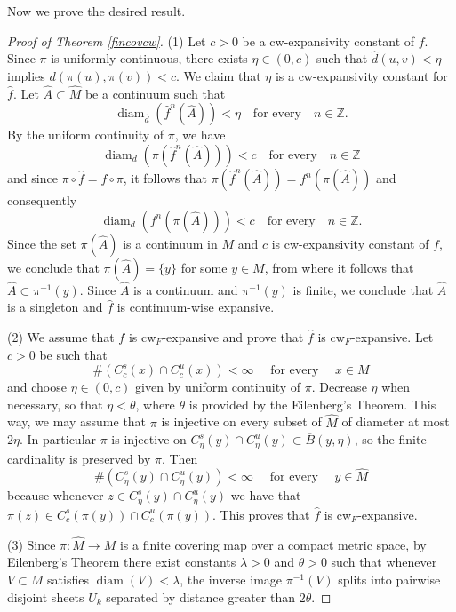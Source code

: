 \documentclass{amsart}
\theoremstyle{plain}
\theoremstyle{definition}
\begin{document}
Now we prove the desired result.

\begin{proof}[Proof of Theorem \ref{fincovcw}]

(1) Let $c>0$ be a cw-expansivity constant of $f$. Since $\pi$ is uniformly continuous, there exists $\eta\in(0,c)$ such that $\widehat d(u,v)<\eta$ implies $d(\pi(u),\pi(v))<c$. We claim that $\eta$ is a cw-expansivity constant for $\widehat f$. Let $\widehat A\subset\widehat M$ be a continuum such that 
$$\operatorname{diam}_{\widehat d}(\widehat f^n(\widehat A))<\eta \,\,\,\,\,\, \text{for every} \,\,\,\,\,\, n\in\mathbb Z.$$
By the uniform continuity of $\pi$, we have
$$\operatorname{diam}_d(\pi(\widehat f^n(\widehat A)))<c\,\,\,\,\,\, \text{for every} \,\,\,\,\,\, n\in\mathbb Z$$
and since $\pi\circ\widehat f=f\circ\pi$, it follows that
$\pi(\widehat f^n(\widehat A))=f^n(\pi(\widehat A))$ and consequently
$$\operatorname{diam}_d(f^n(\pi(\widehat A)))<c\,\,\,\,\,\, \text{for every} \,\,\,\,\,\, n\in\mathbb Z.$$
Since the set $\pi(\widehat A)$ is a continuum in $M$ and $c$ is cw-expansivity constant of $f$, we conclude that $\pi(\widehat A)=\{y\}$ for some $y\in M$, from where it follows that $\widehat A\subset\pi^{-1}(y)$. Since $\widehat A$ is a continuum and $\pi^{-1}(y)$ is finite, we conclude that
$\widehat A$ is a singleton and $\widehat f$ is continuum-wise expansive.

\vspace{+0.2cm}

(2) We assume that $f$ is cw$_F$-expansive and prove that $\widehat f$ is cw$_F$-expansive. Let $c>0$ be such that 
$$\#(C^s_c(x)\cap C^u_c(x))<\infty \quad \text{ for every } \quad x\in M$$
and choose $\eta\in(0,c)$ given by uniform continuity of $\pi$. 
Decrease $\eta$ when necessary, so that $\eta<\theta$, where $\theta$ is provided by the Eilenberg's Theorem.
This way, we may assume that $\pi$ is injective on every subset of $\widehat M$ of diameter at most $2\eta$. In
particular $\pi$ is injective on $C^s_\eta(y)\cap C^u_\eta(y)\subset\overline B(y,\eta)$, so
the finite cardinality is preserved by $\pi$.
Then
$$\#(C^s_{\eta}(y)\cap C^u_{\eta}(y))<\infty \quad \text{ for every } \quad y\in \widehat M$$
because whenever $z\in C^s_{\eta}(y)\cap C^u_{\eta}(y)$ we have that $\pi(z)\in C^s_{c}(\pi(y))\cap C^u_{c}(\pi(y))$. This proves that $\widehat f$ is cw$_F$-expansive.
\vspace{+0.2cm}

(3) Since $\pi:\widehat M\to M$ is a finite covering map over a compact metric space, by Eilenberg's Theorem there exist constants $\lambda>0$ and $\theta>0$ such that whenever $V\subset M$ satisfies $\operatorname{diam}(V)<\lambda$, the inverse image $\pi^{-1}(V)$ splits into pairwise disjoint sheets $U_k$ separated by distance greater than $2\theta$.


\end{proof}
\end{document}
